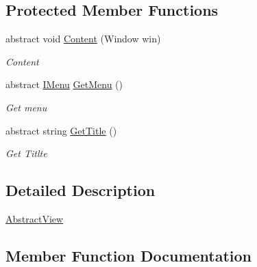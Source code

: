 \subsection*{Protected Member Functions}
\begin{DoxyCompactItemize}
\item 
abstract void \mbox{\hyperlink{class_gtd_app_1_1_console_core_1_1_view_1_1_abstract_view_a8c518373e635d19875713f2b9f2e1592}{Content}} (Window win)
\begin{DoxyCompactList}\small\item\em Content \end{DoxyCompactList}\item 
abstract \mbox{\hyperlink{interface_gtd_app_1_1_console_core_1_1_menu_1_1_i_menu}{I\+Menu}} \mbox{\hyperlink{class_gtd_app_1_1_console_core_1_1_view_1_1_abstract_view_a04360e549fc462f357300c59fa7fadab}{Get\+Menu}} ()
\begin{DoxyCompactList}\small\item\em Get menu \end{DoxyCompactList}\item 
abstract string \mbox{\hyperlink{class_gtd_app_1_1_console_core_1_1_view_1_1_abstract_view_ada76ebf03434f22dbd103a09f292ff7c}{Get\+Title}} ()
\begin{DoxyCompactList}\small\item\em Get Titlte \end{DoxyCompactList}\end{DoxyCompactItemize}


\subsection{Detailed Description}
\mbox{\hyperlink{class_gtd_app_1_1_console_core_1_1_view_1_1_abstract_view}{Abstract\+View}} 



\subsection{Member Function Documentation}
\mbox{\label{class_gtd_app_1_1_console_core_1_1_view_1_1_abstract_view_a8c518373e635d19875713f2b9f2e1592}} 
